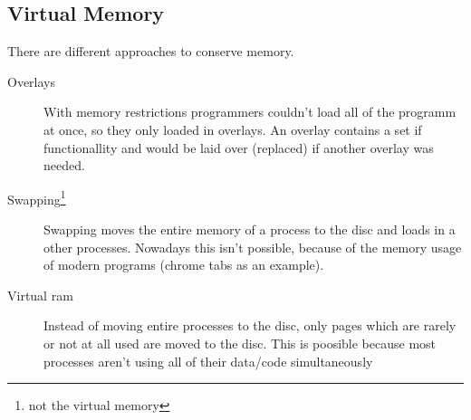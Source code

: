 \documentclass[a4paper]{scrartcl}
\begin{document}
            \subsection{Virtual Memory}
                There are different approaches to conserve memory.
                \begin{description}
                    \item[Overlays] With memory restrictions programmers couldn't load all of the programm at once, so they only loaded in overlays. An overlay contains a set if functionallity
                        and would be laid over (replaced) if another overlay was needed.
                    \item[Swapping\footnote{not the virtual memory}] Swapping moves the entire memory of a process to the disc and loads in a other processes. Nowadays this isn't possible, because
                        of the memory usage of modern programs (chrome tabs as an example).
                    \item[Virtual ram] Instead of moving entire processes to the disc, only pages which are rarely or not at all used are moved to the disc. This is poosible because most processes
                    aren't using all of their data/code simultaneously      
                \end{description} 
\end{document}
